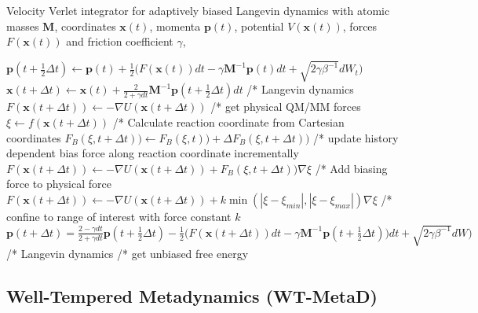 \begin{algorithm}[H]
  \caption{Velocity Verlet integrator for adaptively biased Langevin dynamics with atomic masses $\textbf{M}$, coordinates $\textbf{x}(t)$, momenta $\textbf{p}(t)$, potential $V(\textbf{x}(t))$, forces $F(\textbf{x}(t))$ and friction coefficient $\gamma$,}
  \label{alg:ABM}
    \begin{algorithmic}
        \STATE
        \STATE $\textbf{p}(t+\frac{1}{2}\Delta t) \leftarrow \textbf{p}(t) + \frac{1}{2} \bigl(F(\textbf{x}(t))dt-\gamma \textbf{M}^{-1}\textbf{p}(t) dt + \sqrt{2\gamma\beta^{-1}}dW_t \bigr)$
        \STATE $\textbf{x}(t+\Delta t) \leftarrow \textbf{x}(t) + \frac{2}{2+\gamma dt}\textbf{M}^{-1} \textbf{p}(t+\frac{1}{2}\Delta t) dt$
        \STATE /* Langevin dynamics
        \STATE
        \STATE $F(\textbf{x}(t+\Delta t)) \leftarrow -\nabla U(\textbf{x}(t+\Delta t))$
        \STATE /* get physical QM/MM forces
        \STATE
        \STATE $\xi \leftarrow f(\textbf{x}(t+\Delta t))$
        \STATE /* Calculate reaction coordinate from Cartesian coordinates
        \STATE
          \STATE
          \STATE $F_{B}(\xi, t+\Delta t))\leftarrow F_{B}(\xi, t))+\Delta F_{B}(\xi,t+\Delta t))$
          \STATE /* update history dependent bias force along reaction coordinate incrementally
          \STATE
          \STATE $F(\textbf{x}(t+\Delta t)) \leftarrow -\nabla U(\textbf{x}(t+\Delta t)) + F_{B}(\xi, t+\Delta t))\nabla\xi$
          \STATE /* Add biasing force to physical force
          \STATE
        \ELSE
          \STATE
          \STATE $F(\textbf{x}(t+\Delta t)) \leftarrow -\nabla U(\textbf{x}(t+\Delta t)) + k\min(|\xi-\xi_{min}|,|\xi-\xi_{max}|)\nabla\xi$
          \STATE /* confine to range of interest with force constant $k$
          \STATE
        \ENDIF
        \STATE
        \STATE $\textbf{p}(t+\Delta t) = \frac{2 - \gamma dt}{2+\gamma dt} \textbf{p}(t+\frac{1}{2}\Delta t) - \frac{1}{2} \bigl(F(\textbf{x}(t+\Delta t))dt-\gamma \textbf{M}^{-1}\textbf{p}(t+\frac{1}{2}\Delta t)) dt + \sqrt{2\gamma\beta^{-1}}dW\bigr)$
        \STATE /* Langevin dynamics
        \STATE
      \ENDWHILE
      \STATE /* get unbiased free energy
    \end{algorithmic}
\end{algorithm}
\newpage
\subsection{Well-Tempered Metadynamics (WT-MetaD)}
\label{sec:metaD}

